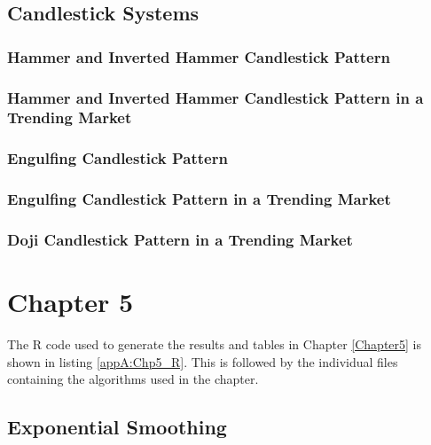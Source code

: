 \subsection{Candlestick Systems}
\subsubsection{Hammer and Inverted Hammer Candlestick Pattern}
\label{appA:Hammer}


\subsubsection{Hammer and Inverted Hammer Candlestick Pattern in a Trending Market}
\label{appA:Hammer_aroon}


\subsubsection{Engulfing Candlestick Pattern}
\label{appA:Engulf}


\subsubsection{Engulfing Candlestick Pattern in a Trending Market}
\label{appA:Engulf_aroon}


\subsubsection{Doji Candlestick Pattern in a Trending Market}
\label{appA:Doji_aroon}


\section{Chapter 5}
The R code used to generate the results and tables in Chapter \ref{Chapter5} is shown in listing \ref{appA:Chp5_R}. This is followed by the individual files containing the algorithms used in the chapter.

\label{appA:Chp5_R}


\subsection{Exponential Smoothing}
\label{appA:es_1}


